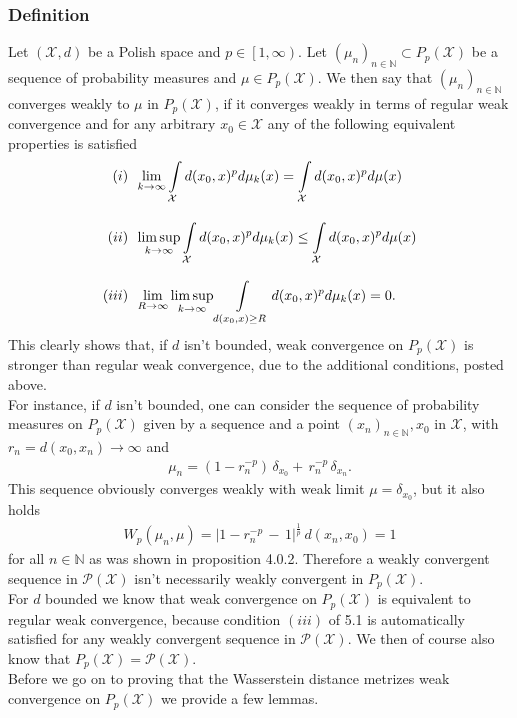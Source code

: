 \documentclass[11pt,a4paper]{article}
\begin{document}
\subsubsection{Definition}
Let $(\mathcal{X},d)$ be a Polish space and $p\in\left[1,\infty\right)$. Let $(\mu_n)_{n\in\mathbb{N}} \subset P_p(\mathcal{X})$ be a sequence of probability measures and $\mu\in{}P_p(\mathcal{X})$. We then say that $(\mu_n)_{n\in\mathbb{N}}$ converges weakly to $\mu$ in $P_p(\mathcal{X})$, if it converges weakly in terms of regular weak convergence and for any arbitrary $x_0\in\mathcal{X}$ any of the following equivalent properties is satisfied\\
\begin{align*}
(i)&\hspace{0.5em}\lim\limits_{k\rightarrow\infty}\int\limits_{\mathcal{X}}d(x_0,x)^pd\mu_k(x)=\int\limits_{\mathcal{X}}d(x_0,x)^pd\mu(x) \\[10pt]
(ii)&\hspace{0.5em}\limsup\limits_{k\rightarrow\infty}\int\limits_{\mathcal{X}}d(x_0,x)^pd\mu_k(x)\leq\int\limits_{\mathcal{X}}d(x_0,x)^pd\mu(x)\\[8pt]
(iii)&\hspace{0.5em}\lim\limits_{R\rightarrow\infty}\limsup\limits_{k\rightarrow\infty}\int\limits_{d(x_0,x)\geq{}R}d(x_0,x)^pd\mu_k(x)=0.
\end{align*}  
This clearly shows that, if $d$ isn't bounded, weak convergence on $P_p(\mathcal{X})$ is stronger than regular weak convergence, due to the additional conditions, posted above.\vspace{1em}\\For instance, if $d$ isn't bounded, one can consider the sequence of probability measures on $P_p(\mathcal{X})$ given by a sequence and a point $(x_n)_{n\in\mathbb{N}}, x_0$ in $\mathcal{X}$, with $r_n=d(x_0,x_n)\rightarrow\infty$ and
\begin{align*}
\mu_n = (1-r^{-p}_n)\,\delta_{x_0} +\, r^{-p}_n\,\delta_{x_n}.
\end{align*}
This sequence obviously converges weakly with weak limit $\mu=\delta_{x_0}$, but it also holds
\begin{align*}
W_p(\mu_n,\mu) = |1-r^{-p}_n\,-\,1|^{\frac{1}{p}}\,d(x_n,x_0) = 1
\end{align*}
for all $n\in\mathbb{N}$ as was shown in proposition 4.0.2. Therefore a weakly convergent sequence in $\mathcal{P(X)}$ isn't necessarily weakly convergent in $P_p(\mathcal{X})$.\vspace{1em}\\
For $d$ bounded we know that weak convergence on $P_p(\mathcal{X})$ is equivalent to regular weak convergence, because condition $(iii)$ of 5.1 is automatically satisfied for any weakly convergent sequence in $\mathcal{P(X)}$. We then of course also know that $P_p(\mathcal{X})=\mathcal{P(X)}.$\vspace{1em}\\
Before we go on to proving that the Wasserstein distance metrizes weak convergence on $P_p(\mathcal{X})$ we provide a few lemmas.
\end{document}
